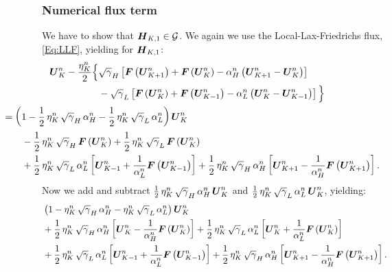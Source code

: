 \subsubsection{Numerical flux term}
We have to show that $\boldsymbol{H}_{K,1}\in\mathcal{G}$. We again we use the Local-Lax-Friedrichs flux, \eqref{Eq:LLF}, yielding for $\boldsymbol{H}_{K,1}$:
\begin{align}
    \bU^{n}_{K}-\f{\eta^{n}_{K}}{2}\Big\{&\sqrtgm_{H}\left[\bF\left(\bU^{n}_{K+1}\right)+\bF\left(\bU^{n}_{K}\right)-\alpha^{n}_{H}\left(\bU^{n}_{K+1}-\bU^{n}_{K}\right)\right]\\
    &-\sqrtgm_{L}\left[\bF\left(\bU^{n}_{K}\right)+\bF\left(\bU^{n}_{K-1}\right)-\alpha^{n}_{L}\left(\bU^{n}_{K}-\bU^{n}_{K-1}\right)\right]\Big\}\\
    &\hspace{-10em}=\left(1-\f{1}{2}\,\eta^{n}_{K}\,\sqrtgm_{H}\,\alpha^{n}_{H}-\f{1}{2}\,\eta^{n}_{K}\,\sqrtgm_{L}\,\alpha^{n}_{L}\right)\bU^{n}_{K}\\
    &\hspace{-8em}-\f{1}{2}\,\eta^{n}_{K}\,\sqrtgm_{H}\,\bF\left(\bU^{n}_{K}\right)+\f{1}{2}\,\eta^{n}_{K}\,\sqrtgm_{L}\,\bF\left(\bU^{n}_{K}\right)\\
    &\hspace{-8em}+\f{1}{2}\,\eta^{n}_{K}\,\sqrtgm_{L}\,\alpha^{n}_{L}\left[\bU^{n}_{K-1}+\f{1}{\alpha^{n}_{L}}\bF\left(\bU^{n}_{K-1}\right)\right]+\f{1}{2}\,\eta^{n}_{K}\,\sqrtgm_{H}\,\alpha^{n}_{H}\left[\bU^{n}_{K+1}-\f{1}{\alpha^{n}_{H}}\bF\left(\bU^{n}_{K+1}\right)\right].
\end{align}
Now we add and subtract $\frac{1}{2}\,\eta^{n}_{K}\,\sqrt{\gamma}_{H}\,\alpha^{n}_{H}\,\boldsymbol{U}^{n}_{K}$ and $\frac{1}{2}\,\eta^{n}_{K}\,\sqrt{\gamma}_{L}\,\alpha^{n}_{L}\,\boldsymbol{U}^{n}_{K}$, yielding:
\begin{align}
    &\left(1-\eta^{n}_{K}\,\sqrt{\gamma}_{H}\,\alpha^{n}_{H}-\eta^{n}_{K}\,\sqrt{\gamma}_{L}\,\alpha^{n}_{L}\right)\boldsymbol{U}^{n}_{K}\\
    &+\frac{1}{2}\,\eta^{n}_{K}\,\sqrt{\gamma}_{H}\,\alpha^{n}_{H}\left[\boldsymbol{U}^{n}_{K}-\frac{1}{\alpha^{n}_{H}}\boldsymbol{F}\left(\boldsymbol{U}^{n}_{K}\right)\right]+\frac{1}{2}\,\eta^{n}_{K}\,\sqrt{\gamma}_{L}\,\alpha^{n}_{L}\left[\boldsymbol{U}^{n}_{K}+\frac{1}{\alpha^{n}_{L}}\boldsymbol{F}\left(\boldsymbol{U}^{n}_{K}\right)\right]\\
    &+\frac{1}{2}\,\eta^{n}_{K}\,\sqrt{\gamma}_{L}\,\alpha^{n}_{L}\left[\boldsymbol{U}^{n}_{K-1}+\frac{1}{\alpha^{n}_{L}}\boldsymbol{F}\left(\boldsymbol{U}^{n}_{K-1}\right)\right]+\frac{1}{2}\,\eta^{n}_{K}\,\sqrt{\gamma}_{H}\,\alpha^{n}_{H}\left[\boldsymbol{U}^{n}_{K+1}-\frac{1}{\alpha^{n}_{H}}\boldsymbol{F}\left(\boldsymbol{U}^{n}_{K+1}\right)\right].
\end{align}
